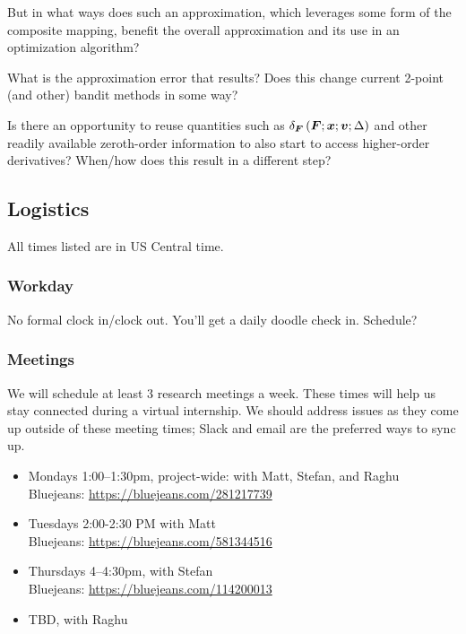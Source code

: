 \documentclass{article}
\begin{document}
But in what ways does such an approximation, which leverages some form of the composite mapping, benefit the overall approximation and its use in an optimization algorithm?

What is the approximation error that results? Does this change current 2-point (and other) bandit methods in some way?

Is there an opportunity to reuse quantities such as $ \delta_{\bm{F}}\left(\bm{F};\bm{x};\bm{v};\Delta\right)$ and other readily available zeroth-order information to also start to access higher-order derivatives? When/how does this result in a different step?




\subsection{Logistics}
\label{sec:logistics}
All times listed are in US Central time.

\subsubsection{Workday}
No formal clock in/clock out. You'll get a daily doodle check in. Schedule?

\subsubsection{Meetings}
We will schedule at least 3 research meetings a week. These times will help us stay connected during a virtual internship.
We should address issues as they come up outside of these meeting times; Slack and email are the preferred ways to sync up.

\begin{itemize}
\item Mondays 1:00--1:30pm, project-wide: with Matt, Stefan, and Raghu
\\
Bluejeans: \url{https://bluejeans.com/281217739}
\item Tuesdays 2:00-2:30 PM with Matt\\
Bluejeans: \url{https://bluejeans.com/581344516}
\item Thursdays 4--4:30pm, with Stefan\\
Bluejeans: \url{https://bluejeans.com/114200013}
\item TBD, with Raghu
\end{itemize}
\end{document}

